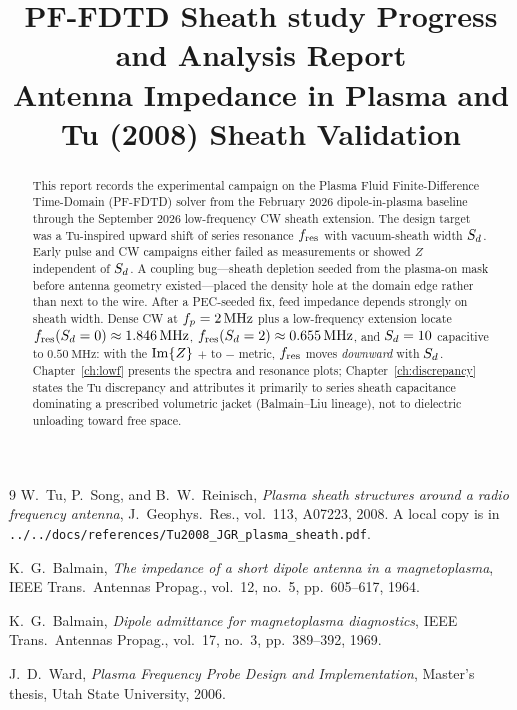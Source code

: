 \documentclass[11pt,letterpaper]{report}
\title{PF-FDTD Sheath study Progress and Analysis Report\\[0.4em]
\large Antenna Impedance in Plasma and Tu (2008) Sheath Validation}
\author{}
\date{}
\begin{document}
\maketitle

\begin{abstract}
This report records the experimental campaign on the Plasma Fluid Finite-Difference Time-Domain (PF-FDTD) solver from the February 2026 dipole-in-plasma baseline through the September 2026 low-frequency CW sheath extension. The design target was a Tu-inspired upward shift of series resonance \(f_{\mathrm{res}}\) with vacuum-sheath width \(S_d\). Early pulse and CW campaigns either failed as measurements or showed \(Z\) independent of \(S_d\). A coupling bug---sheath depletion seeded from the plasma-on mask before antenna geometry existed---placed the density hole at the domain edge rather than next to the wire. After a PEC-seeded fix, feed impedance depends strongly on sheath width. Dense CW at \(f_p=\SI{2}{\mega\hertz}\) plus a low-frequency extension locate \(f_{\mathrm{res}}(S_d=0)\approx\SI{1.846}{\mega\hertz}\), \(f_{\mathrm{res}}(S_d=2)\approx\SI{0.655}{\mega\hertz}\), and \(S_d=10\) capacitive to \(\SI{0.50}{\mega\hertz}\): with the \(\operatorname{Im}\{Z\}\) \(+\) to \(-\) metric, \(f_{\mathrm{res}}\) moves \emph{downward} with \(S_d\). Chapter~\ref{ch:lowf} presents the spectra and resonance plots; Chapter~\ref{ch:discrepancy} states the Tu discrepancy and attributes it primarily to series sheath capacitance dominating a prescribed volumetric jacket (Balmain--Liu lineage), not to dielectric unloading toward free space.
\end{abstract}

\tableofcontents













\begin{thebibliography}{9}
W.~Tu, P.~Song, and B.~W.~Reinisch,
\textit{Plasma sheath structures around a radio frequency antenna},
J.\ Geophys.\ Res., vol.~113, A07223, 2008.
A local copy is in \texttt{../../docs/references/Tu2008\_JGR\_plasma\_sheath.pdf}.

K.~G.~Balmain,
\textit{The impedance of a short dipole antenna in a magnetoplasma},
IEEE Trans.\ Antennas Propag., vol.~12, no.~5, pp.~605--617, 1964.

K.~G.~Balmain,
\textit{Dipole admittance for magnetoplasma diagnostics},
IEEE Trans.\ Antennas Propag., vol.~17, no.~3, pp.~389--392, 1969.

J.~D.~Ward,
\textit{Plasma Frequency Probe Design and Implementation},
Master's thesis, Utah State University, 2006.
\end{thebibliography}
\end{document}
